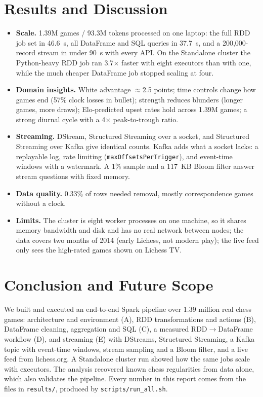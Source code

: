 \documentclass[11pt,a4paper]{article}
\begin{document}
\section{Results and Discussion}
\begin{itemize}\itemsep1pt
\item \textbf{Scale.} 1.39M games / 93.3M tokens processed on one laptop: the full RDD job
set in 46.6~s, all DataFrame and SQL queries in 37.7~s, and a 200,000-record stream in under
90~s with every API. On the Standalone cluster the Python-heavy RDD job ran 3.7$\times$ faster with eight executors than with one, while the much cheaper DataFrame job stopped scaling at four.
\item \textbf{Domain insights.} White advantage $\approx$2.5 points; time controls change
how games end (57\% clock losses in bullet); strength reduces blunders (longer games, more
draws); Elo-predicted upset rates hold across 1.39M games; a strong diurnal cycle with a 4$\times$
peak-to-trough ratio.
\item \textbf{Streaming.} DStream, Structured Streaming over a socket, and Structured
Streaming over Kafka give identical counts. Kafka adds what a socket lacks: a replayable log,
rate limiting (\texttt{maxOffsetsPerTrigger}), and event-time windows with a watermark.
A 1\% sample and a 117~KB Bloom filter answer stream questions with fixed memory.
\item \textbf{Data quality.} 0.33\% of rows needed removal, mostly correspondence games
without a clock.
\item \textbf{Limits.} The cluster is eight worker processes on one machine, so it shares
memory bandwidth and disk and has no real network between nodes; the data covers two
months of 2014 (early Lichess, not modern play); the live feed only sees the high-rated games
shown on Lichess TV.
\end{itemize}

\section{Conclusion and Future Scope}
We built and executed an end-to-end Spark pipeline over 1.39 million real chess games:
architecture and environment (A), RDD transformations and actions (B), DataFrame cleaning,
aggregation and SQL (C), a measured RDD$\rightarrow$DataFrame workflow (D), and streaming (E)
with DStreams, Structured Streaming, a Kafka topic with event-time windows, stream sampling and
a Bloom filter, and a live feed from lichess.org. A Standalone cluster run showed how the same
jobs scale with executors. The analysis recovered known chess regularities from data alone,
which also validates the pipeline. Every number in this report comes from the files in
\texttt{results/}, produced by \texttt{scripts/run\_all.sh}.
\end{document}
